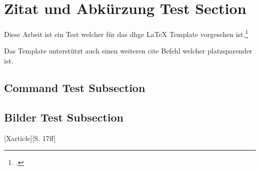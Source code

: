 \section{Zitat und Abkürzung Test Section}

Diese Arbeit ist ein Test welcher f\"ur das \ac{dhge} LaTeX Template vorgesehen ist.\footcite{Xarticle}

Das Template unterstützt auch einen weiteren cite Befehl welcher platzsparender ist.\supercite{Xarticle}

\cleardoublepage

\subsection{Command Test Subsection}

\doubleunderline{$150\mathrm{\Omega}$}

\subsection{Bilder Test Subsection}

[Xarticle][S. 17ff]
